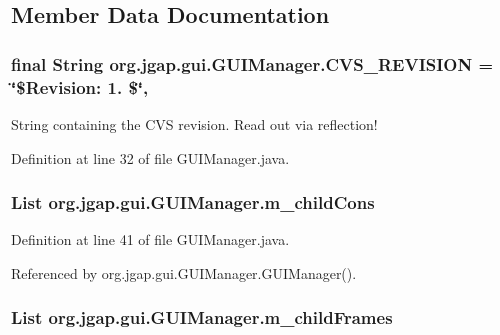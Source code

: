 \subsection{Member Data Documentation}
\hypertarget{classorg_1_1jgap_1_1gui_1_1_g_u_i_manager_abfdd0fd50f2f3956f6ba5d9058ed2c3d}{
\subsubsection[{C\-V\-S\-\_\-\-R\-E\-V\-I\-S\-I\-O\-N}]{\setlength{\rightskip}{0pt plus 5cm}final String org.\-jgap.\-gui.\-G\-U\-I\-Manager.\-C\-V\-S\-\_\-\-R\-E\-V\-I\-S\-I\-O\-N = \char`\"{}\$Revision\-: 1. \$\char`\"{}\hspace{0.3cm}{\ttfamily [static]}, {\ttfamily [private]}}}\label{classorg_1_1jgap_1_1gui_1_1_g_u_i_manager_abfdd0fd50f2f3956f6ba5d9058ed2c3d}
String containing the C\-V\-S revision. Read out via reflection! 

Definition at line 32 of file G\-U\-I\-Manager.\-java.

\hypertarget{classorg_1_1jgap_1_1gui_1_1_g_u_i_manager_abff4e608e58f59b78ea559bc3d9f2481}{
\subsubsection[{m\-\_\-child\-Cons}]{\setlength{\rightskip}{0pt plus 5cm}List org.\-jgap.\-gui.\-G\-U\-I\-Manager.\-m\-\_\-child\-Cons\hspace{0.3cm}{\ttfamily [private]}}}\label{classorg_1_1jgap_1_1gui_1_1_g_u_i_manager_abff4e608e58f59b78ea559bc3d9f2481}


Definition at line 41 of file G\-U\-I\-Manager.\-java.



Referenced by org.\-jgap.\-gui.\-G\-U\-I\-Manager.\-G\-U\-I\-Manager().

\hypertarget{classorg_1_1jgap_1_1gui_1_1_g_u_i_manager_a1eadb20bb511d8e744ebc1e6ba00c497}{
\subsubsection[{m\-\_\-child\-Frames}]{\setlength{\rightskip}{0pt plus 5cm}List org.\-jgap.\-gui.\-G\-U\-I\-Manager.\-m\-\_\-child\-Frames\hspace{0.3cm}{\ttfamily [private]}}}\label{classorg_1_1jgap_1_1gui_1_1_g_u_i_manager_a1eadb20bb511d8e744ebc1e6ba00c497}


